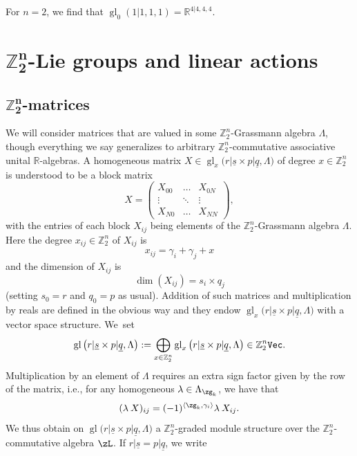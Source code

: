 \documentclass[pdftex]{sigma}%
\newcommand{\op}[1]{\operatorname{#1}}
\newcommand{\R}{{\mathbb R}}
\newcommand{\Z}{{\mathbb Z}}
\def\ul{\underline}
\def\ul{\underline}
\newcommand{\0}{\otimes}
\newcommand{\z}{\Z_2^n}
\numberwithin{equation}{section}
\begin{document}
\begin{Example}
For $n=2$, we find that $\op{gl}_0(1|1,1,1) = \R^{4|4,4,4}$.
\end{Example}

\section[Z2n-Lie groups and linear actions]%
{$\boldsymbol{\Z_2^n}$-Lie groups and linear actions}

\newcommand{\gl}{\op{gl}}
\newcommand{\rim}{\mathring}

\subsection[Z2n-matrices]
{$\boldsymbol{\Z_2^n}$-matrices}\label{subsec:Zmatrices}
We will consider matrices that are valued in some $\Z_2^n$-Grassmann algebra $\Lambda$, though everything we say generalizes to arbitrary $\Z_2^n$-commutative associative unital $\R$-algebras. A homogeneous matrix $X \in \gl_x\big(r|\ul s\times p|\ul{q},\Lambda\big)$ of degree $x\in\z$ is understood to be a block matrix
\begin{equation*}%
X =\begin{pmatrix}
X_{00} & \dotsc & X_{0N} \\
\hline
\vdots & \ddots & \vdots \\
\hline
X_{N0} & \dotsc & X_{NN}
\end{pmatrix}\!,
\end{equation*}
with the entries of each block $X_{ij}$ being elements of the $\Z_2^n$-Grassmann algebra $\Lambda$. Here the degree $x_{ij}\in\z$ of $X_{ij}$ is
\[
x_{ij} = \gamma_i + \gamma_j + x
\]
and the dimension of $X_{ij}$ is
\[
\dim(X_{ij}) = s_i \times q_j
\]
(setting $s_0=r$ and $q_0 = p$ as usual). Addition of such matrices and multiplication by reals are defined in the obvious way and they endow $\gl_x\big(r|\ul s\times p|\ul{q},\Lambda\big)$ with a vector space structure. We~set
\[
\gl\big(r|\ul s\times p|\ul{q},\Lambda\big):=\bigoplus_{x\in\z}\gl_x\big(r|\ul s\times p|\ul{q},\Lambda\big)\in\z{\tt Vec}.
\]
Multiplication by an element of $\Lambda$ requires an extra sign factor given by the row of the matrix, i.e., for any homogeneous $\lambda \in \Lambda_{\zg_k}$, we have that
\[
(\lambda\: X)_{ij} = (-1)^{\langle \zg_k, \gamma_i\rangle} \lambda \: X_{ij}.
\]
We thus obtain on $\gl\big(r|\ul s\times p|\ul{q},\Lambda\big)$ a $\z$-graded module structure over the $\z$-commutative algebra $\zL$. If $ r|\ul s=p|\ul q$, we write
\end{document}
